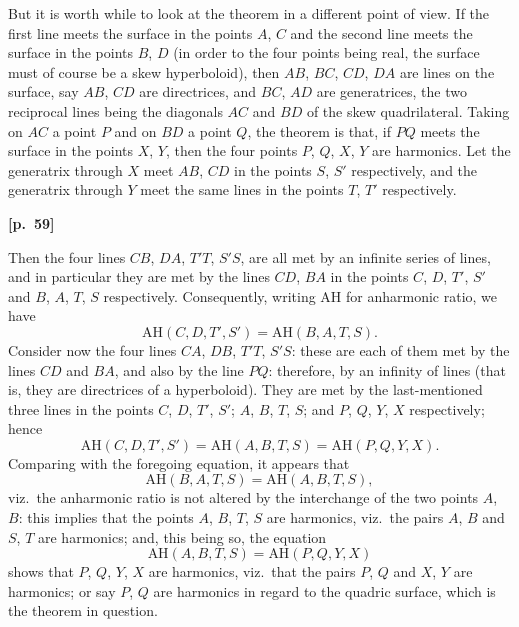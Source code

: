 \documentclass[11pt,a4paper]{article}
\theoremstyle{plain}
\begin{document}
But it is worth while to look at the theorem in a different point of view. If the first line meets the surface in the points $A$, $C$ and the second line meets the surface in the points $B$, $D$ (in order to the four points being real, the surface must of course be a skew hyperboloid), then $AB$, $BC$, $CD$, $DA$ are lines on the surface, say $AB$, $CD$ are directrices, and $BC$, $AD$ are generatrices, the two reciprocal lines being the diagonals $AC$ and $BD$ of the skew quadrilateral. Taking on $AC$ a point $P$ and on $BD$ a point $Q$, the theorem is that, if $PQ$ meets the surface in the points $X$, $Y$, then the four points $P$, $Q$, $X$, $Y$ are harmonics. Let the generatrix through $X$ meet $AB$, $CD$ in the points $S$, $S'$ respectively, and the generatrix through $Y$ meet the same lines in the points $T$, $T'$ respectively.

\vspace{0.5em}
\noindent\textbf{[p.\ 59]}

Then the four lines $CB$, $DA$, $T'T$, $S'S$, are all met by an infinite series of lines, and in particular they are met by the lines $CD$, $BA$ in the points $C$, $D$, $T'$, $S'$ and $B$, $A$, $T$, $S$ respectively. Consequently, writing AH for anharmonic ratio, we have
$$
\text{AH}(C, D, T', S') = \text{AH}(B, A, T, S).
$$
Consider now the four lines $CA$, $DB$, $T'T$, $S'S$: these are each of them met by the lines $CD$ and $BA$, and also by the line $PQ$: therefore, by an infinity of lines (that is, they are directrices of a hyperboloid). They are met by the last-mentioned three lines in the points $C$, $D$, $T'$, $S'$; $A$, $B$, $T$, $S$; and $P$, $Q$, $Y$, $X$ respectively; hence
$$
\text{AH}(C, D, T', S') = \text{AH}(A, B, T, S) = \text{AH}(P, Q, Y, X).
$$
Comparing with the foregoing equation, it appears that
$$
\text{AH}(B, A, T, S) = \text{AH}(A, B, T, S),
$$
viz.\ the anharmonic ratio is not altered by the interchange of the two points $A$, $B$: this implies that the points $A$, $B$, $T$, $S$ are harmonics, viz.\ the pairs $A$, $B$ and $S$, $T$ are harmonics; and, this being so, the equation
$$
\text{AH}(A, B, T, S) = \text{AH}(P, Q, Y, X)
$$
shows that $P$, $Q$, $Y$, $X$ are harmonics, viz.\ that the pairs $P$, $Q$ and $X$, $Y$ are harmonics; or say $P$, $Q$ are harmonics in regard to the quadric surface, which is the theorem in question.

\newpage
\end{document}
